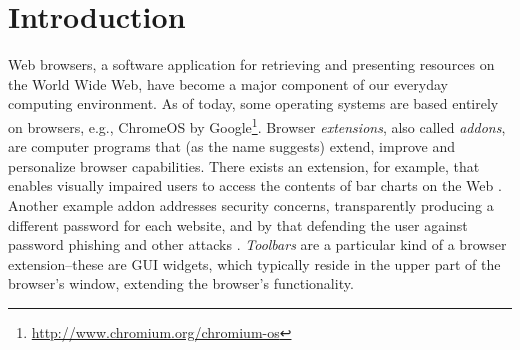 \documentclass[ijoc,nonblindrev]{informs3} %
\numberwithin{equation}{subsection}
\begin{document}
%

\newpage
\section {Introduction}

Web browsers, a software application for retrieving and presenting resources on the World Wide Web, have become a major component of our everyday computing environment. As of today, some operating systems are based entirely on browsers, e.g., ChromeOS by Google\footnote{\url{http://www.chromium.org/chromium-os}}. Browser {\it extensions}, also called {\it addons}, are computer programs that (as the name suggests) extend, improve and personalize browser capabilities. There exists an extension, for example, that enables visually impaired users to access the contents of bar charts on the Web \citep{elzer2007browser}. Another example addon addresses security concerns, transparently producing a different password for each website, and by that defending the user against password phishing and other attacks \citep{ross2005stronger}. {\it Toolbars} are a particular kind of a browser extension--these are GUI widgets, which typically reside in the upper part of the browser's window, extending the browser's functionality. 
\end{document}
